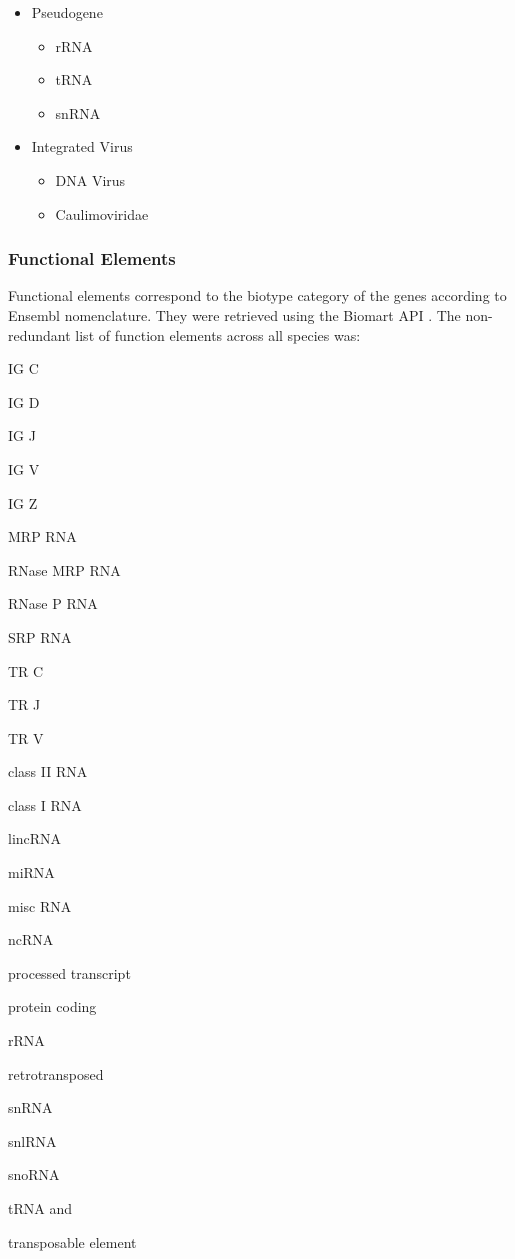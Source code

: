 \begin{itemize}
\begin{itemize}
  \end{itemize}
\item Pseudogene
  \begin{itemize}
  \item rRNA
  \item tRNA
  \item snRNA 
  \end{itemize}
\item Integrated Virus
  \begin{itemize}
  \item DNA Virus
  \item Caulimoviridae 
  \end{itemize}
\end{itemize}

\subsubsection{Functional Elements}

Functional elements correspond to the biotype category of the genes according to Ensembl \cite{Flicek2011} nomenclature. They were retrieved using the Biomart API \cite{Kinsella2011}. The non-redundant list of function elements across all species was:

\begin{inparaenum}[\itshape 1-]
  \item IG C
  \item IG D
  \item IG J
  \item IG V
  \item IG Z
  \item MRP RNA
  \item RNase MRP RNA
  \item RNase P RNA
  \item SRP RNA
  \item TR C
  \item TR J
  \item TR V
  \item class II RNA
  \item class I RNA
  \item lincRNA
  \item miRNA
  \item misc RNA
  \item ncRNA
  \item processed transcript
  \item protein coding
  \item rRNA
  \item retrotransposed
  \item snRNA
  \item snlRNA
  \item snoRNA
  \item tRNA
  and \item transposable element
\end{inparaenum}

